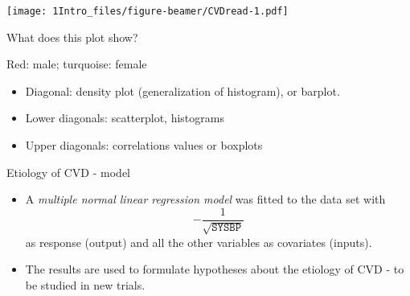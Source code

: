 \documentclass[ignorenonframetext,]{beamer}
\providecommand{\tightlist}{%
  \setlength{\itemsep}{0pt}\setlength{\parskip}{0pt}}
\begin{document}
\begin{frame}

\texttt{[image: 1Intro\_files/figure-beamer/CVDread-1.pdf]}

What does this plot show?

Red: male; turquoise: female

\end{frame}

\begin{frame}

\begin{itemize}
\tightlist
\item
  Diagonal: density plot (generalization of histogram), or barplot.
\item
  Lower diagonals: scatterplot, histograms
\item
  Upper diagonals: correlations values or boxplots
\end{itemize}

\end{frame}

\begin{frame}

\begin{block}{Etiology of CVD - model}

\begin{itemize}
\item
  A \emph{multiple normal linear regression model} was fitted to the
  data set with \[-\frac{1}{\sqrt{\texttt{SYSBP}}}\] as response
  (output) and all the other variables as covariates (inputs).
\item
  The results are used to formulate hypotheses about the etiology of CVD
  - to be studied in new trials.
\end{itemize}

\end{block}

\end{frame}
\end{document}
